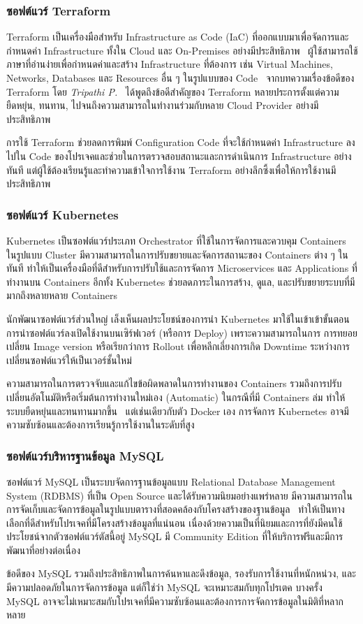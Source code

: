 \documentclass[12pt,one side,openright,a4paper]{cpe-thesis-th}
\newcommand{\thaijustify}[1]{%
  \par\hspace{30pt}\justifying
  #1
}
\begin{document}
\subsubsection{ซอฟต์แวร์ Terraform}
\thaijustify{
  Terraform เป็นเครื่องมือสำหรับ Infrastructure as Code (IaC) ที่ออกแบบมาเพื่อจัดการและกำหนดค่า Infrastructure ทั้งใน Cloud และ On-Premises อย่างมีประสิทธิภาพ~\cite{terraform} ผู้ใช้สามารถใช้ภาษาที่อ่านง่ายเพื่อกำหนดค่าและสร้าง Infrastructure ที่ต้องการ เช่น Virtual Machines, Networks, Databases และ Resources อื่น ๆ ในรูปแบบของ Code~\cite{terraform} จากบทความเรื่องข้อดีของ Terraform โดย \textit{Tripathi P.}~\cite{tripathi23terraform} ได้พูดถึงข้อดีสำคัญของ Terraform หลายประการตั้งแต่ความยืดหยุ่น, ทนทาน, ไปจนถึงความสามารถในทำงานร่วมกับหลาย Cloud Provider อย่างมีประสิทธิภาพ
}
\thaijustify{
  การใช้ Terraform ช่วยลดการพิมพ์ Configuration Code ที่จะใช้กำหนดค่า Infrastructure ลงไปใน Code ของโปรเจคและช่วยในการตรวจสอบสถานะและการดำเนินการ Infrastructure อย่างทันที แต่ผู้ใช้ต้องเรียนรู้และทำความเข้าใจการใช้งาน Terraform อย่างลึกซึ้งเพื่อให้การใช้งานมีประสิทธิภาพ~\cite{stanfield22iac}
}
\subsubsection{ซอฟต์แวร์ Kubernetes}
\thaijustify{
  Kubernetes เป็นซอฟต์แวร์ประเภท Orchestrator ที่ใช้ในการจัดการและควบคุม Containers ในรูปแบบ Cluster มีความสามารถในการปรับขยายและจัดการสถานะของ Containers ต่าง ๆ ในทันที ทำให้เป็นเครื่องมือที่ดีสำหรับการปรับใช้และการจัดการ Microservices และ Applications ที่ทำงานบน Containers อีกทั้ง Kubernetes ช่วยลดภาระในการสร้าง, ดูแล, และปรับขยายระบบที่มีมากถึงหลายหลาย Containers~\cite{kubernetes}
}
\thaijustify{
  นักพัฒนาซอฟต์แวร์ส่วนใหญ่ เล็งเห็นผลประโยชน์ของการนำ Kubernetes มาใช้ในเข้าเข้าขั้นตอนการนำซอฟต์แวร์ลงเปิดใช้งานบนเซิร์ฟเวอร์ (หรือการ Deploy) เพราะความสามารถในการ การทยอยเปลี่ยน Image version หรือเรียกว่าการ Rollout เพื่อหลีกเลี่ยงการเกิด Downtime ระหว่างการเปลี่ยนซอฟต์แวร์ให้เป็นเวอร์ชั้นใหม่~\cite{kubemed20}
}
\thaijustify{
  ความสามารถในการตรวจจับและแก้ไขข้อผิดพลาดในการทำงานของ Containers รวมถึงการปรับเปลี่ยนอัตโนมัติหรือเริ่มต้นการทำงานใหม่เอง (Automatic) ในกรณีที่มี Containers ล่ม ทำให้ระบบยืดหยุ่นและทนทานมากขึ้น~\cite{kubernetes} แต่เช่นเดียวกับตัว Docker เอง การจัดการ Kubernetes อาจมีความซับซ้อนและต้องการเรียนรู้การใช้งานในระดับที่สูง
}
\subsubsection{ซอฟต์แวร์บริหารฐานข้อมูล MySQL}
\thaijustify{
  ซอฟต์แวร์ MySQL เป็นระบบจัดการฐานข้อมูลแบบ Relational Database Management System (RDBMS) ที่เป็น Open Source และได้รับความนิยมอย่างแพร่หลาย มีความสามารถในการจัดเก็บและจัดการข้อมูลในรูปแบบตารางที่สอดคล้องกับโครงสร้างของฐานข้อมูล~\cite{mysql} ทำให้เป็นทางเลือกที่ดีสำหรับโปรเจคที่มีโครงสร้างข้อมูลที่แน่นอน เนื่องด้วยความเป็นที่นิยมและการที่ยังมีคนใช้ประโยชน์จากตัวซอฟต์แวร์ตัสนี้อยู่ MySQL มี Community Edition ที่ให้บริการฟรีและมีการพัฒนาที่อย่างต่อเนื่อง~\cite{mysqlcomm}
}
\thaijustify{
  ข้อดีของ MySQL รวมถึงประสิทธิภาพในการค้นหาและดึงข้อมูล, รองรับการใช้งานที่หนักหน่วง, และมีความปลอดภัยในการจัดการข้อมูล แต่ก็ใช่ว่า MySQL จะเหมาะสมกับทุกโปรเตค  บางครั้ง MySQL อาจจะไม่เหมาะสมกับโปรเจคที่มีความซับซ้อนและต้องการการจัดการข้อมูลในมิติที่หลากหลาย
}
\end{document}
